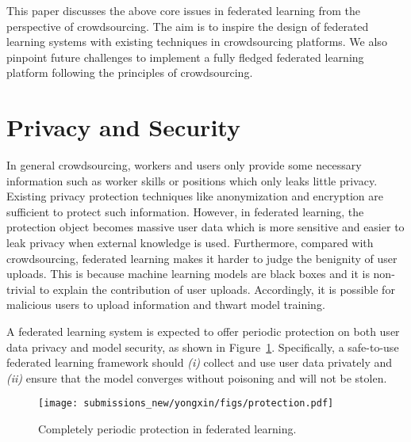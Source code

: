 \documentclass[11pt]{article}
\newcommand\figref[1]{Figure~\ref{#1}}
\newcommand\secref[1]{Section~\ref{#1}}
\begin{document}
This paper discusses the above core issues in federated learning from the perspective of crowdsourcing.
The aim is to inspire the design of federated learning systems with existing techniques in crowdsourcing platforms. 
We also pinpoint future challenges to implement a fully fledged federated learning platform following the principles of crowdsourcing.


\section{Privacy and Security}
In general crowdsourcing, workers and users only provide some necessary information such as worker skills or positions which only leaks little privacy.
Existing privacy protection techniques like anonymization and encryption are sufficient to protect such information.
However, in federated learning, the protection object becomes massive user data which is more sensitive and easier to leak privacy when external knowledge is used.
Furthermore, compared with crowdsourcing, federated learning makes it harder to judge the benignity of user uploads.
This is because machine learning models are black boxes and it is non-trivial to explain the contribution of user uploads.
Accordingly, it is possible for malicious users to upload information and thwart model training.


A federated learning system is expected to offer periodic protection on both user data privacy and model security, as shown in \figref{fig:protection}.
Specifically, a safe-to-use federated learning framework should 
\textit{(i)} collect and use user data privately and 
\textit{(ii)} ensure that the model converges without poisoning and will not be stolen.

\begin{figure}
\centering
\texttt{[image: submissions\_new/yongxin/figs/protection.pdf]}
\caption{Completely periodic protection in federated learning.}
\label{fig:protection}
\end{figure}
\end{document}
